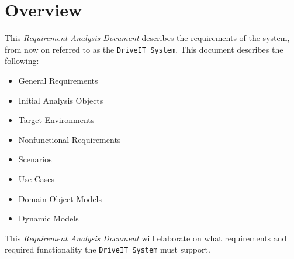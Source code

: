 \section{Overview}
This \textit{Requirement Analysis Document} describes the requirements of the system, from now on referred to as the \texttt{DriveIT System}.
This document describes the following:
\begin{itemize}
	\item General Requirements
	\item Initial Analysis Objects
	\item Target Environments
	\item Nonfunctional Requirements
	\item Scenarios
	\item Use Cases 
	\item Domain Object Models
	\item Dynamic Models 
\end{itemize}

This \textit{Requirement Analysis Document} will elaborate on what requirements and required functionality the \texttt{DriveIT System} must support.